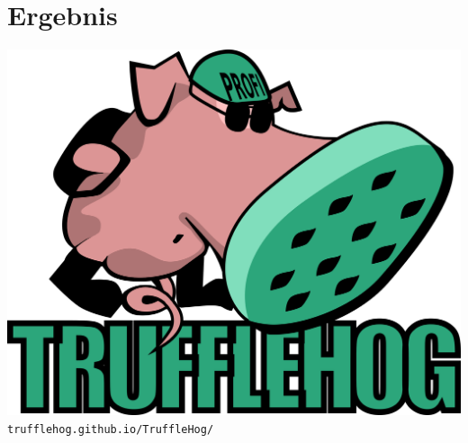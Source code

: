 \documentclass[18pt]{beamer}
\begin{document}
\section{Ergebnis}
    
    

\begin{frame}
	\centering
	\includegraphics[width=0.8\linewidth]{images/title}\newline
	\texttt{trufflehog.github.io/TruffleHog/}
\end{frame}

\appendix
\beginbackup


\backupend
\end{document}
